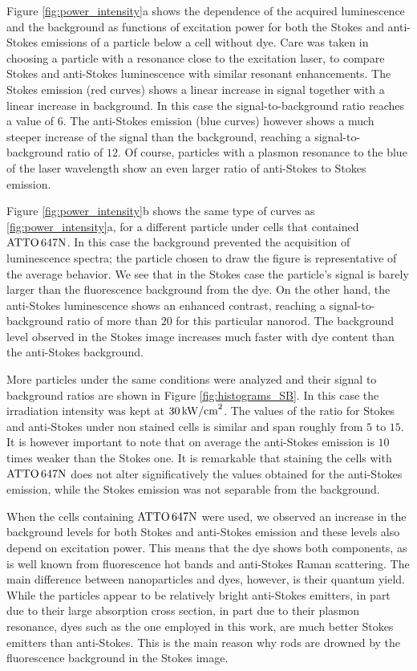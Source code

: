 Figure \ref{fig:power_intensity}a shows the dependence of the acquired
luminescence and the background as functions of excitation power for both the
Stokes and anti-Stokes emissions of a particle below a cell without dye. Care
was taken in choosing a particle with a resonance close to the excitation laser,
to compare Stokes and anti-Stokes luminescence with similar resonant
enhancements. The Stokes emission (red curves) shows a linear increase in signal
together with a linear increase in background. In this case the
signal-to-background ratio reaches a value of $6$. The anti-Stokes emission
(blue curves) however shows a much steeper increase of the signal than the
background, reaching a signal-to-background ratio of $12$. Of course, particles
with a plasmon resonance to the blue of the laser wavelength show an even larger
ratio of anti-Stokes to Stokes emission.

Figure \ref{fig:power_intensity}b shows the same type of curves as
\ref{fig:power_intensity}a, for a different particle under cells that contained
$\textrm{ATTO}\,647\textrm{N}$. In this case the background prevented the acquisition of luminescence
spectra; the particle chosen to draw the figure is representative of the average
behavior. We see that in the Stokes case the particle's signal is barely larger
than the fluorescence background from the dye. On the other hand, the
anti-Stokes luminescence shows an enhanced contrast, reaching a
signal-to-background ratio of more than $20$ for this particular nanorod. The
background level observed in the Stokes image increases much faster with dye
content than the anti-Stokes background. 

More particles under the same conditions were analyzed and their
signal to background ratios are shown in Figure \ref{fig:histograms_SB}. In this
case the irradiation intensity was kept at $30\,\textrm{kW/cm}^2$. The values of the ratio for
Stokes and anti-Stokes under non stained cells is similar and span roughly from
$5$ to $15$. It is however important to note that on average the anti-Stokes
emission is $10$ times weaker than the Stokes one. It is remarkable that
staining the cells with $\textrm{ATTO}\,647\textrm{N}$ does not alter significatively the values
obtained for the anti-Stokes emission, while the Stokes emission was not separable from
the background.

When the cells containing $\textrm{ATTO}\,647\textrm{N}$ were used, we observed an increase in the
background levels for both Stokes and anti-Stokes emission and these levels also
depend on excitation power. This means that the dye shows both
components, as is well known from fluorescence hot bands and anti-Stokes Raman
scattering. The main difference between nanoparticles and dyes, however, is
their quantum yield. While the particles appear to be relatively bright
anti-Stokes emitters, in part due to their large absorption cross section, in
part due to their plasmon resonance, dyes such as the one employed in this work,
are much better Stokes emitters than anti-Stokes. This is the main reason why
rods are drowned by the fluorescence background in the Stokes image.

